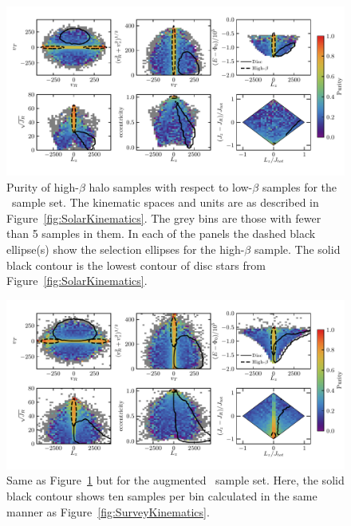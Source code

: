\begin{figure}
	\centering
	\includegraphics[width=\textwidth]{figure/ch2/SolarHaloPurityGrid.pdf}
	\caption{Purity of high-$\beta$ halo samples with respect to low-$\beta$ samples for the \solar\ sample set. The kinematic spaces and units are as described in Figure~\ref{fig:SolarKinematics}. The grey bins are those with fewer than 5 samples in them. In each of the panels the dashed black ellipse(s) show the selection ellipses for the high-$\beta$ sample. The solid black contour is the lowest contour of disc stars from Figure~\ref{fig:SolarKinematics}.}
	\label{fig:SolarHaloPurity}
\end{figure}

\begin{figure}
	\centering
	\includegraphics[width=\textwidth]{figure/ch2/SurveyHaloPurityGrid.pdf}
	\caption{Same as Figure~\ref{fig:SolarHaloPurity} but for the augmented \survey\ sample set. Here, the solid black contour shows ten samples per bin calculated in the same manner as Figure~\ref{fig:SurveyKinematics}.}
	\label{fig:SurveyHaloPurity}
\end{figure}

